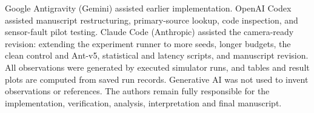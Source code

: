 Google Antigravity (Gemini) assisted earlier implementation. OpenAI Codex assisted manuscript restructuring, primary-source lookup, code inspection, and sensor-fault pilot testing. Claude Code (Anthropic) assisted the camera-ready revision: extending the experiment runner to more seeds, longer budgets, the clean control and Ant-v5, statistical and latency scripts, and manuscript revision. All observations were generated by executed simulator runs, and tables and result plots are computed from saved run records. Generative AI was not used to invent observations or references. The authors remain fully responsible for the implementation, verification, analysis, interpretation and final manuscript.
